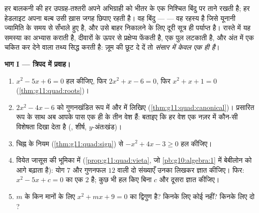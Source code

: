 \begin{problem}
\label{pb:g11:quad:1}
हर बालकनी की हर उपग्रह-तश्तरी अपने अभिग्राही को भीतर के एक निश्चित बिंदु पर
ताने रखती है; हर हेडलाइट अपना बल्ब उसी ख़ास जगह छिपाए रहती है। वह बिंदु ---
\emph{} --- वह रहस्य है जिसे  यूनानी ज्यामिति के समय से सँभाले हुए
है, और उसे बाहर निकालने के लिए दूरी सूत्र ही पर्याप्त है। रास्ते में यह
समस्या  का अभ्यास कराती है, दीवारों के ऊपर से प्रक्षेप्य फेंकती है,
एक पुल लटकाती है, और अंत में एक चकित कर देने वाला तथ्य सिद्ध करती है: ज़ूम
की छूट दे दें तो \emph{संसार में केवल एक ही  है}।

\medskip
\noindent\textbf{भाग I --- त्रिपद में प्रवाह।}
\begin{enumerate}
  \item $x^2 - 5x + 6 = 0$ हल कीजिए, फिर $2x^2 + x - 6 = 0$, फिर $x^2 + x + 1 = 0$ (\cref{thm:g11:quad:roots})।
  \item $2x^2 - 4x - 6$ को गुणनखंडित रूप में और  में लिखिए (\cref{thm:g11:quad:canonical})। प्रसारित
        रूप के साथ अब आपके पास एक ही  के तीन वेश हैं: बताइए कि हर वेश
        एक नज़र में कौन-सी विशेषता दिखा देता है (, शीर्ष, $y$-अंतःखंड)।
  \item चिह्न के नियम (\cref{thm:g11:quad:sign}) से $-x^2 + 4x - 3 \geq 0$ हल कीजिए।
  \item वियेत जासूस की भूमिका में (\cref{prop:g11:quad:vieta}, जो \cref{pb:g10:algebra:1} में बेबीलोन को आगे
        बढ़ाता है): योग $7$ और गुणनफल $12$ वाली दो संख्याएँ उनका 
        लिखकर ज्ञात कीजिए। फिर: $x^2 - 5x + c = 0$ का एक  $2$ है; कुछ भी हल किए
        बिना $c$ और दूसरा  ज्ञात कीजिए।
  \item $m$ के किन मानों के लिए $x^2 + mx + 9 = 0$ का द्विगुण  है? किनके लिए कोई
         नहीं? किनके लिए दो ?
\end{enumerate}


\end{problem}
